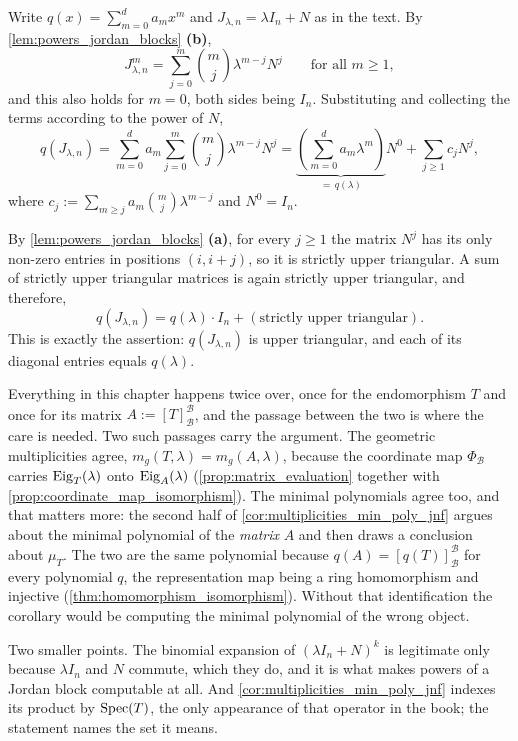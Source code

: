 \begin{exercisesolution}
\label{sol:polynomial_of_jordan_block}
Write $q(x) = \sum_{m=0}^d a_m x^m$ and $J_{\lambda, n} = \lambda I_n + N$ as in the text. By \cref{lem:powers_jordan_blocks} \textbf{(b)},
\[ J_{\lambda,n}^m = \sum_{j=0}^m \binom{m}{j} \lambda^{m-j} N^j \qquad \text{for all } m \ge 1, \]
and this also holds for $m = 0$, both sides being $I_n$. Substituting and collecting the terms according to the power of $N$,
\[
    q(J_{\lambda,n}) = \sum_{m=0}^d a_m \sum_{j=0}^m \binom{m}{j} \lambda^{m-j} N^j = \underbrace{\left(\sum_{m=0}^d a_m \lambda^m\right)}_{= \, q(\lambda)} N^0 + \sum_{j \ge 1} c_j N^j,
\]
where $c_j := \sum_{m \ge j} a_m \binom{m}{j} \lambda^{m-j}$ and $N^0 = I_n$.

By \cref{lem:powers_jordan_blocks} \textbf{(a)}, for every $j \ge 1$ the matrix $N^j$ has its only non-zero entries in positions $(i, i+j)$, so it is strictly upper triangular. A sum of strictly upper triangular matrices is again strictly upper triangular, and therefore,
\[ q(J_{\lambda,n}) = q(\lambda) \cdot I_n + (\text{strictly upper triangular}). \]
This is exactly the assertion: $q(J_{\lambda,n})$ is upper triangular, and each of its diagonal entries equals $q(\lambda)$.
\end{exercisesolution}

\begin{ainote}
Everything in this chapter happens twice over, once for the endomorphism $T$ and
once for its matrix $A := [T]_{\mathcal{B}}^{\mathcal{B}}$, and the passage
between the two is where the care is needed. Two such passages carry the
argument. The geometric multiplicities agree,
$m_g(T, \lambda) = m_g(A, \lambda)$, because the coordinate map
$\Phi_{\mathcal{B}}$ carries $\operatorname{Eig}_T(\lambda)$ onto $\operatorname{Eig}_A(\lambda)$
(\cref{prop:matrix_evaluation} together with
\cref{prop:coordinate_map_isomorphism}). The minimal polynomials agree too, and
that matters more: the second half of \cref{cor:multiplicities_min_poly_jnf}
argues about the minimal polynomial of the \emph{matrix} $A$ and then draws a
conclusion about $\mu_T$. The two are the same polynomial because
$q(A) = [q(T)]_{\mathcal{B}}^{\mathcal{B}}$ for every polynomial $q$, the
representation map being a ring homomorphism and injective
(\cref{thm:homomorphism_isomorphism}). Without that identification the corollary
would be computing the minimal polynomial of the wrong object.

Two smaller points. The binomial expansion of $(\lambda I_n + N)^k$ is
legitimate only because $\lambda I_n$ and $N$ commute, which they do, and it is
what makes powers of a Jordan block computable at all. And
\cref{cor:multiplicities_min_poly_jnf} indexes its product by $\operatorname{Spec}(T)$, the
only appearance of that operator in the book; the statement names the set it
means.
\end{ainote}


